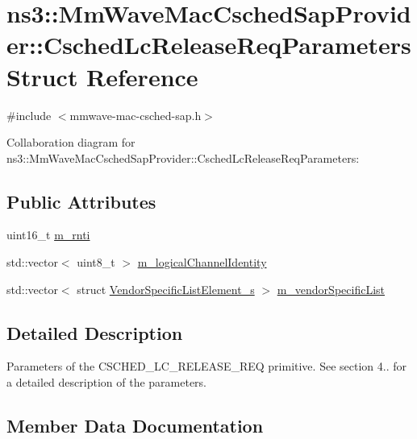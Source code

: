 \hypertarget{structns3_1_1MmWaveMacCschedSapProvider_1_1CschedLcReleaseReqParameters}{}\section{ns3\+:\+:Mm\+Wave\+Mac\+Csched\+Sap\+Provider\+:\+:Csched\+Lc\+Release\+Req\+Parameters Struct Reference}
\label{structns3_1_1MmWaveMacCschedSapProvider_1_1CschedLcReleaseReqParameters}


{\ttfamily \#include $<$mmwave-\/mac-\/csched-\/sap.\+h$>$}



Collaboration diagram for ns3\+:\+:Mm\+Wave\+Mac\+Csched\+Sap\+Provider\+:\+:Csched\+Lc\+Release\+Req\+Parameters\+:
\subsection*{Public Attributes}
\begin{DoxyCompactItemize}
\item 
uint16\+\_\+t \hyperlink{structns3_1_1MmWaveMacCschedSapProvider_1_1CschedLcReleaseReqParameters_a6e122d00d602c81c56f4f90af3a65d6a}{m\+\_\+rnti}
\item 
std\+::vector$<$ uint8\+\_\+t $>$ \hyperlink{structns3_1_1MmWaveMacCschedSapProvider_1_1CschedLcReleaseReqParameters_acd7f98450f64502df3b4627328c8a04d}{m\+\_\+logical\+Channel\+Identity}
\item 
std\+::vector$<$ struct \hyperlink{structns3_1_1VendorSpecificListElement__s}{Vendor\+Specific\+List\+Element\+\_\+s} $>$ \hyperlink{structns3_1_1MmWaveMacCschedSapProvider_1_1CschedLcReleaseReqParameters_ac34f1389e047c14412a861a0835f7ee8}{m\+\_\+vendor\+Specific\+List}
\end{DoxyCompactItemize}


\subsection{Detailed Description}
Parameters of the C\+S\+C\+H\+E\+D\+\_\+\+L\+C\+\_\+\+R\+E\+L\+E\+A\+S\+E\+\_\+\+R\+EQ primitive. See section 4.. for a detailed description of the parameters. 

\subsection{Member Data Documentation}
